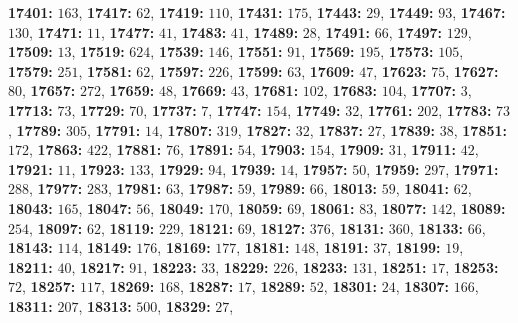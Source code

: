 \textsf{\bfseries 17401:} $163$, \textsf{\bfseries 17417:} $62$, \textsf{\bfseries 17419:} $110$, \textsf{\bfseries 17431:} $175$, \textsf{\bfseries 17443:} $29$, \textsf{\bfseries 17449:} $93$, \textsf{\bfseries 17467:} $130$, \textsf{\bfseries 17471:} $11$, \textsf{\bfseries 17477:} $41$, \textsf{\bfseries 17483:} $41$, \textsf{\bfseries 17489:} $28$, \textsf{\bfseries 17491:} $66$, \textsf{\bfseries 17497:} $129$, \textsf{\bfseries 17509:} $13$, \textsf{\bfseries 17519:} $624$, \textsf{\bfseries 17539:} $146$, \textsf{\bfseries 17551:} $91$, \textsf{\bfseries 17569:} $195$, \textsf{\bfseries 17573:} $105$, \textsf{\bfseries 17579:} $251$, \textsf{\bfseries 17581:} $62$, \textsf{\bfseries 17597:} $226$, \textsf{\bfseries 17599:} $63$, \textsf{\bfseries 17609:} $47$, \textsf{\bfseries 17623:} $75$, \textsf{\bfseries 17627:} $80$, \textsf{\bfseries 17657:} $272$, \textsf{\bfseries 17659:} $48$, \textsf{\bfseries 17669:} $43$, \textsf{\bfseries 17681:} $102$, \textsf{\bfseries 17683:} $104$, \textsf{\bfseries 17707:} $3$, \textsf{\bfseries 17713:} $73$, \textsf{\bfseries 17729:} $70$, \textsf{\bfseries 17737:} $7$, \textsf{\bfseries 17747:} $154$, \textsf{\bfseries 17749:} $32$, \textsf{\bfseries 17761:} $202$, \textsf{\bfseries 17783:} $73$, \textsf{\bfseries 17789:} $305$, \textsf{\bfseries 17791:} $14$, \textsf{\bfseries 17807:} $319$, \textsf{\bfseries 17827:} $32$, \textsf{\bfseries 17837:} $27$, \textsf{\bfseries 17839:} $38$, \textsf{\bfseries 17851:} $172$, \textsf{\bfseries 17863:} $422$, \textsf{\bfseries 17881:} $76$, \textsf{\bfseries 17891:} $54$, \textsf{\bfseries 17903:} $154$, \textsf{\bfseries 17909:} $31$, \textsf{\bfseries 17911:} $42$, \textsf{\bfseries 17921:} $11$, \textsf{\bfseries 17923:} $133$, \textsf{\bfseries 17929:} $94$, \textsf{\bfseries 17939:} $14$, \textsf{\bfseries 17957:} $50$, \textsf{\bfseries 17959:} $297$, \textsf{\bfseries 17971:} $288$, \textsf{\bfseries 17977:} $283$, \textsf{\bfseries 17981:} $63$, \textsf{\bfseries 17987:} $59$, \textsf{\bfseries 17989:} $66$, \textsf{\bfseries 18013:} $59$, \textsf{\bfseries 18041:} $62$, \textsf{\bfseries 18043:} $165$, \textsf{\bfseries 18047:} $56$, \textsf{\bfseries 18049:} $170$, \textsf{\bfseries 18059:} $69$, \textsf{\bfseries 18061:} $83$, \textsf{\bfseries 18077:} $142$, \textsf{\bfseries 18089:} $254$, \textsf{\bfseries 18097:} $62$, \textsf{\bfseries 18119:} $229$, \textsf{\bfseries 18121:} $69$, \textsf{\bfseries 18127:} $376$, \textsf{\bfseries 18131:} $360$, \textsf{\bfseries 18133:} $66$, \textsf{\bfseries 18143:} $114$, \textsf{\bfseries 18149:} $176$, \textsf{\bfseries 18169:} $177$, \textsf{\bfseries 18181:} $148$, \textsf{\bfseries 18191:} $37$, \textsf{\bfseries 18199:} $19$, \textsf{\bfseries 18211:} $40$, \textsf{\bfseries 18217:} $91$, \textsf{\bfseries 18223:} $33$, \textsf{\bfseries 18229:} $226$, \textsf{\bfseries 18233:} $131$, \textsf{\bfseries 18251:} $17$, \textsf{\bfseries 18253:} $72$, \textsf{\bfseries 18257:} $117$, \textsf{\bfseries 18269:} $168$, \textsf{\bfseries 18287:} $17$, \textsf{\bfseries 18289:} $52$, \textsf{\bfseries 18301:} $24$, \textsf{\bfseries 18307:} $166$, \textsf{\bfseries 18311:} $207$, \textsf{\bfseries 18313:} $500$, \textsf{\bfseries 18329:} $27$, 
